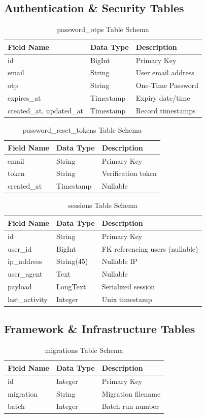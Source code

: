 \subsection{Authentication \& Security Tables}
\begin{longtable}{|l|l|p{7.5cm}|}
\caption{password\_otps Table Schema} \\
\hline
\textbf{Field Name} & \textbf{Data Type} & \textbf{Description} \\ \hline
id & BigInt & Primary Key \\ \hline
email & String & User email address \\ \hline
otp & String & One-Time Password \\ \hline
expires\_at & Timestamp & Expiry date/time \\ \hline
created\_at, updated\_at & Timestamp & Record timestamps \\ \hline
\end{longtable}

\begin{longtable}{|l|l|p{7.5cm}|}
\caption{password\_reset\_tokens Table Schema} \\
\hline
\textbf{Field Name} & \textbf{Data Type} & \textbf{Description} \\ \hline
email & String & Primary Key \\ \hline
token & String & Verification token \\ \hline
created\_at & Timestamp & Nullable \\ \hline
\end{longtable}

\begin{longtable}{|l|l|p{7.5cm}|}
\caption{sessions Table Schema} \\
\hline
\textbf{Field Name} & \textbf{Data Type} & \textbf{Description} \\ \hline
id & String & Primary Key \\ \hline
user\_id & BigInt & FK referencing users (nullable) \\ \hline
ip\_address & String(45) & Nullable IP \\ \hline
user\_agent & Text & Nullable \\ \hline
payload & LongText & Serialized session \\ \hline
last\_activity & Integer & Unix timestamp \\ \hline
\end{longtable}

\subsection{Framework \& Infrastructure Tables}
\begin{longtable}{|l|l|p{7.5cm}|}
\caption{migrations Table Schema} \\
\hline
\textbf{Field Name} & \textbf{Data Type} & \textbf{Description} \\ \hline
id & Integer & Primary Key \\ \hline
migration & String & Migration filename \\ \hline
batch & Integer & Batch run number \\ \hline
\end{longtable}

